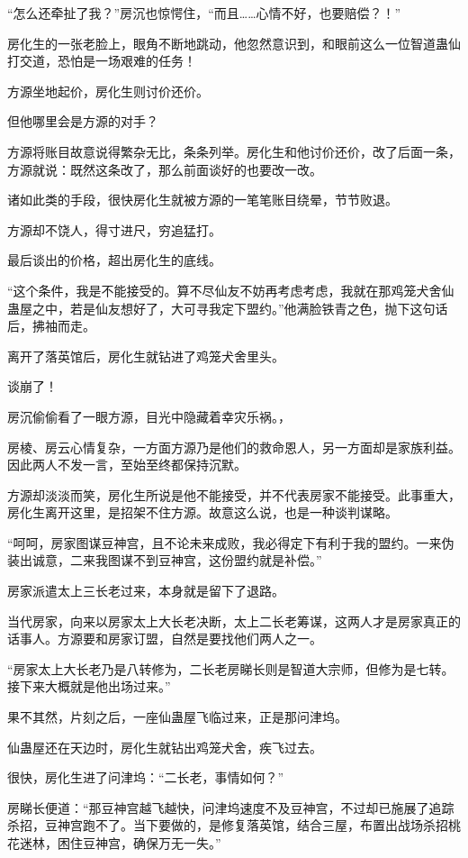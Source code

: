 \begin{this_body}
“怎么还牵扯了我？”房沉也惊愕住，“而且……心情不好，也要赔偿？！”

房化生的一张老脸上，眼角不断地跳动，他忽然意识到，和眼前这么一位智道蛊仙打交道，恐怕是一场艰难的任务！

方源坐地起价，房化生则讨价还价。

但他哪里会是方源的对手？

方源将账目故意说得繁杂无比，条条列举。房化生和他讨价还价，改了后面一条，方源就说：既然这条改了，那么前面谈好的也要改一改。

诸如此类的手段，很快房化生就被方源的一笔笔账目绕晕，节节败退。

方源却不饶人，得寸进尺，穷追猛打。

最后谈出的价格，超出房化生的底线。

“这个条件，我是不能接受的。算不尽仙友不妨再考虑考虑，我就在那鸡笼犬舍仙蛊屋之中，若是仙友想好了，大可寻我定下盟约。”他满脸铁青之色，抛下这句话后，拂袖而走。

离开了落英馆后，房化生就钻进了鸡笼犬舍里头。

谈崩了！

房沉偷偷看了一眼方源，目光中隐藏着幸灾乐祸。，

房棱、房云心情复杂，一方面方源乃是他们的救命恩人，另一方面却是家族利益。因此两人不发一言，至始至终都保持沉默。

方源却淡淡而笑，房化生所说是他不能接受，并不代表房家不能接受。此事重大，房化生离开这里，是招架不住方源。故意这么说，也是一种谈判谋略。

“呵呵，房家图谋豆神宫，且不论未来成败，我必得定下有利于我的盟约。一来伪装出诚意，二来我图谋不到豆神宫，这份盟约就是补偿。”

房家派遣太上三长老过来，本身就是留下了退路。

当代房家，向来以房家太上大长老决断，太上二长老筹谋，这两人才是房家真正的话事人。方源要和房家订盟，自然是要找他们两人之一。

“房家太上大长老乃是八转修为，二长老房睇长则是智道大宗师，但修为是七转。接下来大概就是他出场过来。”

果不其然，片刻之后，一座仙蛊屋飞临过来，正是那问津坞。

仙蛊屋还在天边时，房化生就钻出鸡笼犬舍，疾飞过去。

很快，房化生进了问津坞：“二长老，事情如何？”

房睇长便道：“那豆神宫越飞越快，问津坞速度不及豆神宫，不过却已施展了追踪杀招，豆神宫跑不了。当下要做的，是修复落英馆，结合三屋，布置出战场杀招桃花迷林，困住豆神宫，确保万无一失。”


\end{this_body}
